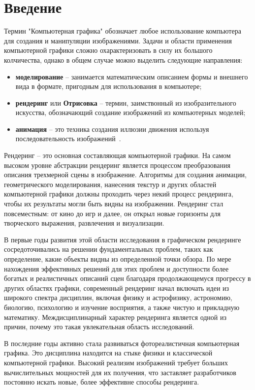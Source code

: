 \chapter*{Введение}

Термин "Компьютерная графика" обозначает любое использование компьютера для создания 
и манипуляции изображениями. Задачи и области применения компьютерной графики 
сложно охарактеризовать в силу их большого колчичества, однако в общем случае можно выделить 
следующие направления:
\begin{itemize}[label*=---]
    \item \textbf{моделирование} -- занимается математическим описанием формы и внешнего вида
в формате, пригодным для использования в компьютере;
    \item \textbf{рендеринг} или \textbf{Отрисовка} -- термин, заимствонный из изобразительного 
искусства, обозначающий создание изображений из компьютерных моделей;
    \item \textbf{анимация} -- это техника создания иллюзии движения используя последовательность изображений~\cite{FoCG}.
\end{itemize}

Рендеринг -- это основная составляющая компьютерной графики. 
На самом высоком уровне абстракции рендеринг является процессом 
преобразования описания трехмерной сцены в изображение. Алгоритмы для создания 
анимации, геометрического моделирования, нанесения текстур и других областей 
компьютерной графики должны проходить через некий процесс рендеринга, 
чтобы их результаты могли быть видны на изображении. Рендеринг стал 
повсеместным: от кино до игр и далее, он открыл новые горизонты для 
творческого выражения, развлечения и визуализации.

В первые годы развития этой области исследования в графическом рендеринге 
сосредоточивались на решении фундаментальных проблем, таких как определение, 
какие объекты видны из определенной точки обзора. По мере нахождения 
эффективных решений для этих проблем и доступности более богатых и 
реалистичных описаний сцен благодаря продолжающемуся прогрессу в других 
областях графики, современный рендеринг начал включать идеи из широкого 
спектра дисциплин, включая физику и астрофизику, астрономию, биологию, 
психологию и изучение восприятия, а также чистую и прикладную математику. 
Междисциплинарный характер рендеринга является одной из причин, почему 
это такая увлекательная область исследований.

В последние годы активно стала развиваться фотореалистичная компьютерная 
графика. Это дисциплина находится на стыке физики и классической 
компьютерной графики. Высокий реализим изображений требует больших 
вычислительных мощностей для их получения, что заставляет разработчиков 
постоянно искать новые, более эффективне способы рендеринга.

